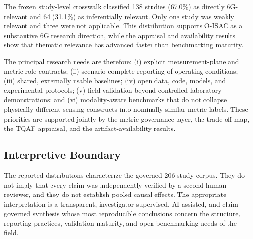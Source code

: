 The frozen study-level crosswalk classified 138 studies (67.0\%) as directly
6G-relevant and 64 (31.1\%) as inferentially relevant. Only one study was weakly
relevant and three were not applicable. This distribution supports O-ISAC as a
substantive 6G research direction, while the appraisal and availability results
show that thematic relevance has advanced faster than benchmarking maturity.

The principal research needs are therefore: (i) explicit measurement-plane and
metric-role contracts; (ii) scenario-complete reporting of operating
conditions; (iii) shared, externally usable baselines; (iv) open data, code,
models, and experimental protocols; (v) field validation beyond controlled
laboratory demonstrations; and (vi) modality-aware benchmarks that do not
collapse physically different sensing constructs into nominally similar metric
labels. These priorities are supported jointly by the metric-governance layer,
the trade-off map, the TQAF appraisal, and the artifact-availability results.

\subsection{Interpretive Boundary}

The reported distributions characterize the governed 206-study corpus. They
do not imply that every claim was independently verified by a second human
reviewer, and they do not establish pooled causal effects. The appropriate
interpretation is a transparent, investigator-supervised, AI-assisted, and
claim-governed synthesis whose most reproducible conclusions concern the
structure, reporting practices, validation maturity, and open benchmarking
needs of the field.
